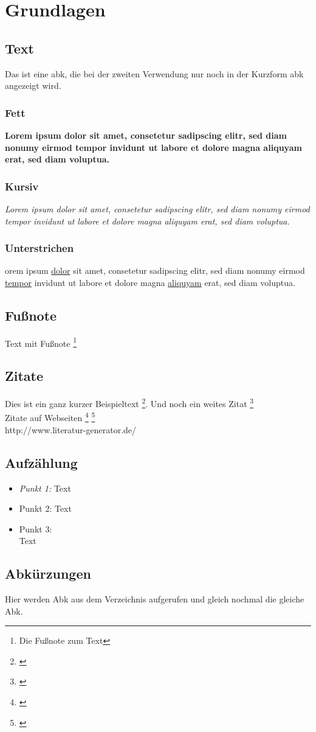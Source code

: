 \chapter{Grundlagen}
\section{Text}
Das ist eine \gls{abk}, die bei der zweiten Verwendung nur noch in der Kurzform \gls{abk} angezeigt wird.

\subsection{Fett}
\textbf{Lorem ipsum dolor sit amet, consetetur sadipscing elitr, sed diam nonumy eirmod tempor invidunt ut labore et dolore magna aliquyam erat, sed diam voluptua.}

\subsection{Kursiv}
\textit{Lorem ipsum dolor sit amet, consetetur sadipscing elitr, sed diam nonumy eirmod tempor invidunt ut labore et dolore magna aliquyam erat, sed diam voluptua.}

\subsection{Unterstrichen}
orem ipsum \underline{dolor} sit amet, consetetur sadipscing elitr, sed diam nonumy eirmod \underline{tempor} invidunt ut labore et dolore magna \underline{aliquyam} erat, sed diam voluptua.

\section{Fußnote}

Text mit Fußnote \footnote{Die Fußnote zum Text} 

\section{Zitate}

Dies ist ein ganz kurzer Beispieltext \footnote{\cite{Jacobsen2017}}. Und noch ein weites Zitat \footnote{\cite{Jacobsen2017}}
\\
Zitate auf Webseiten \footnote{\cite{Jacobsen2017}} \footnote{\cite{Jacobsen2017}}
\\
http://www.literatur-generator.de/

\section{Aufzählung}

\begin{itemize}
\item\textit{Punkt 1:} Text
\item Punkt 2: Text
\item Punkt 3: \\ Text
\end{itemize}

\section{Abkürzungen}
Hier werden \gls{Abk} aus dem Verzeichnis aufgerufen und gleich nochmal die gleiche \gls{Abk}.